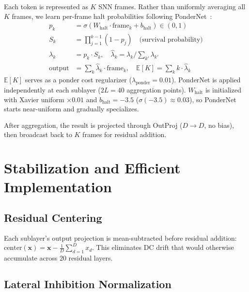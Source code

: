 \documentclass{article}
\newcommand{\Expect}{\mathbb{E}}
\begin{document}
Each token is represented as $K$ SNN frames.
Rather than uniformly averaging all $K$ frames, we learn per-frame halt probabilities following PonderNet~\citep{banino2021pondernet}:
\begin{align}
    p_k &= \sigma(W_{\text{halt}} \cdot \text{frame}_k + b_{\text{halt}}) \in (0, 1) \label{eq:ponder-halt} \\
    S_k &= \textstyle\prod_{j=1}^{k-1} (1 - p_j) \quad \text{(survival probability)} \label{eq:ponder-survive} \\
    \lambda_k &= p_k \cdot S_k, \quad \hat{\lambda}_k = \lambda_k / \textstyle\sum_{k'} \lambda_{k'} \label{eq:ponder-lambda} \\
    \text{output} &= \textstyle\sum_k \hat{\lambda}_k \cdot \text{frame}_k, \quad \Expect[K] = \textstyle\sum_k k \cdot \hat{\lambda}_k \label{eq:ponder-agg}
\end{align}
$\Expect[K]$ serves as a ponder cost regularizer ($\lambda_{\text{ponder}} = 0.01$).
PonderNet is applied independently at each sublayer ($2L = 40$ aggregation points).
$W_{\text{halt}}$ is initialized with Xavier uniform $\times 0.01$ and $b_{\text{halt}} = -3.5$ ($\sigma(-3.5) \approx 0.03$), so PonderNet starts near-uniform and gradually specializes.

After aggregation, the result is projected through OutProj ($D \to D$, no bias), then broadcast back to $K$ frames for residual addition.

\section{Stabilization and Efficient Implementation}
\label{sec:implementation}

\subsection{Residual Centering}
\label{sec:residual-centering}

Each sublayer's output projection is mean-subtracted before residual addition:
$\text{center}(\mathbf{x}) = \mathbf{x} - \frac{1}{D} \sum_{d=1}^{D} x_d$.
This eliminates DC drift that would otherwise accumulate across 20 residual layers.

\subsection{Lateral Inhibition Normalization}
\label{sec:lateral-inhibition}
\end{document}
